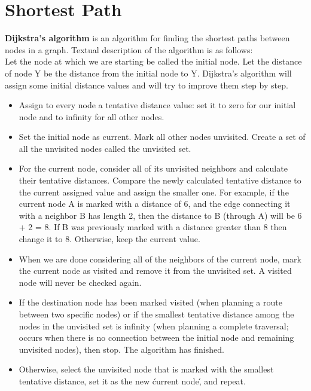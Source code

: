 \section{Shortest Path}
\textbf{Dijkstra's algorithm} is an algorithm for finding the shortest paths between nodes in a graph. Textual description of the algorithm is as follows:\\[1em]
Let the node at which we are starting be called the initial node. Let the distance of node Y be the distance from the initial node to Y. Dijkstra's algorithm will assign some initial distance values and will try to improve them step by step.\\[0.5em]
\begin{itemize}
	\vspace{-1em}
	\item Assign to every node a tentative distance value: set it to zero for our initial node and to infinity for all other nodes.
	\item Set the initial node as current. Mark all other nodes unvisited. Create a set of all the unvisited nodes called the unvisited set.
	\item For the current node, consider all of its unvisited neighbors and calculate their tentative distances. Compare the newly calculated tentative distance to the current assigned value and assign the smaller one. For example, if the current node A is marked with a distance of 6, and the edge connecting it with a neighbor B has length 2, then the distance to B (through A) will be 6 + 2 = 8. If B was previously marked with a distance greater than 8 then change it to 8. Otherwise, keep the current value.
	\item When we are done considering all of the neighbors of the current node, mark the current node as visited and remove it from the unvisited set. A visited node will never be checked again.
	\item If the destination node has been marked visited (when planning a route between two specific nodes) or if the smallest tentative distance among the nodes in the unvisited set is infinity (when planning a complete traversal; occurs when there is no connection between the initial node and remaining unvisited nodes), then stop. The algorithm has finished.
	\item Otherwise, select the unvisited node that is marked with the smallest tentative distance, set it as the new \'current node\', and repeat.
\end{itemize}
\cite{dijkstra1959note}